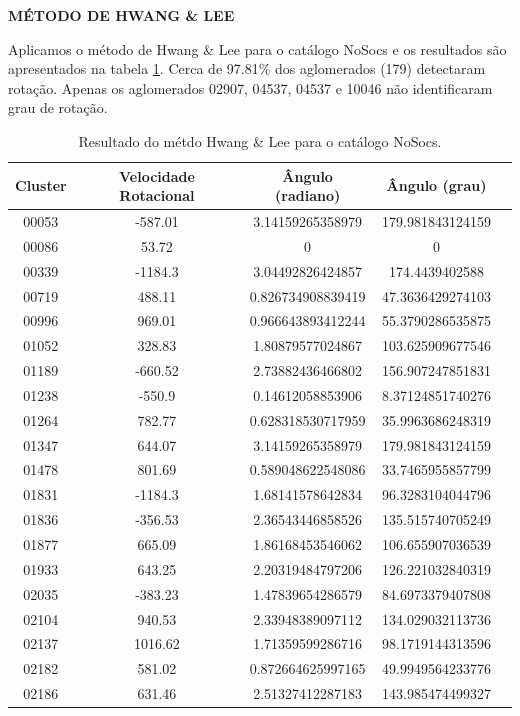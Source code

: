 \textbf{MÉTODO DE HWANG \& LEE}

Aplicamos o método de Hwang \& Lee para o catálogo NoSocs e os resultados são apresentados na tabela \ref{tab:nosocshwang}. Cerca de 97.81\% dos aglomerados (179) detectaram rotação. Apenas os aglomerados 02907, 04537, 04537 e 10046 não identificaram grau de rotação.

{\small
\begin{longtable}{ccccc}
\caption{Resultado do métdo Hwang \& Lee para o catálogo NoSocs.}\label{tab:nosocshwang}
\\ \hline
\textbf{Cluster} & \textbf{Velocidade Rotacional} & \textbf{Ângulo (radiano)} & \textbf{Ângulo (grau)} \\ \hline
00053 & -587.01 & 3.14159265358979 & 179.981843124159 \\
00086 & 53.72 & 0 & 0 \\
00339 & -1184.3 & 3.04492826424857 & 174.4439402588 \\
00719 & 488.11 & 0.826734908839419 & 47.3636429274103 \\
00996 & 969.01 & 0.966643893412244 & 55.3790286535875 \\
01052 & 328.83 & 1.80879577024867 & 103.625909677546 \\
01189 & -660.52 & 2.73882436466802 & 156.907247851831 \\
01238 & -550.9 & 0.14612058853906 & 8.37124851740276 \\
01264 & 782.77 & 0.628318530717959 & 35.9963686248319 \\
01347 & 644.07 & 3.14159265358979 & 179.981843124159 \\
01478 & 801.69 & 0.589048622548086 & 33.7465955857799 \\
01831 & -1184.3 & 1.68141578642834 & 96.3283104044796 \\
01836 & -356.53 & 2.36543446858526 & 135.515740705249 \\
01877 & 665.09 & 1.86168453546062 & 106.655907036539 \\
01933 & 643.25 & 2.20319484797206 & 126.221032840319 \\
02035 & -383.23 & 1.47839654286579 & 84.6973379407808 \\
02104 & 940.53 & 2.33948389097112 & 134.029032113736 \\
02137 & 1016.62 & 1.71359599286716 & 98.1719144313596 \\
02182 & 581.02 & 0.872664625997165 & 49.9949564233776 \\
02186 & 631.46 & 2.51327412287183 & 143.985474499327 \\

\end{longtable}}
